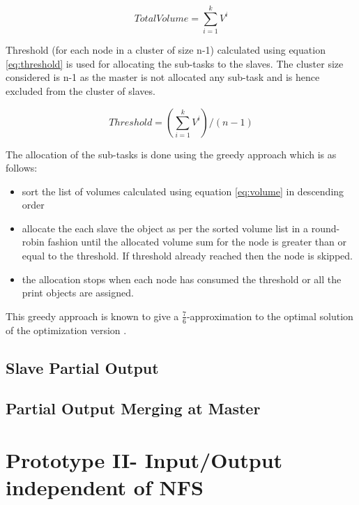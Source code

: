 \begin{equation}
\label{eq:Sum}
Total Volume =\sum\limits_{i=1}^{k}{V^i}
\end{equation}

Threshold (for each node in a cluster of size n-1) calculated using equation \ref{eq:threshold} is used for allocating the sub-tasks to the slaves. The cluster size considered is n-1 as the master is not allocated any sub-task and is hence excluded from the cluster of slaves.

\begin{equation}
\label{eq:threshold}
Threshold =(\sum\limits_{i=1}^{k}{V^i})/(n-1)
\end{equation}

The allocation of the sub-tasks is done using the greedy approach which is as follows: 
\begin{itemize}
\item sort the list of volumes calculated using equation \ref{eq:volume} in descending order
\item allocate the each slave the object as per the sorted volume list in a round-robin fashion until the allocated volume sum for the node is greater than or equal to the threshold. If threshold already reached then the node is skipped. 
\item the allocation stops when each node has consumed the threshold or all the print objects are assigned.
\end{itemize}

This greedy approach is known to give a \begin{math} \frac{7}{6} \end{math}-approximation to the optimal solution of the optimization version \cite{pp2016}.


\subsection{Slave Partial Output}


\subsection{Partial Output Merging at Master} 

\section{Prototype II- Input/Output independent of NFS }

